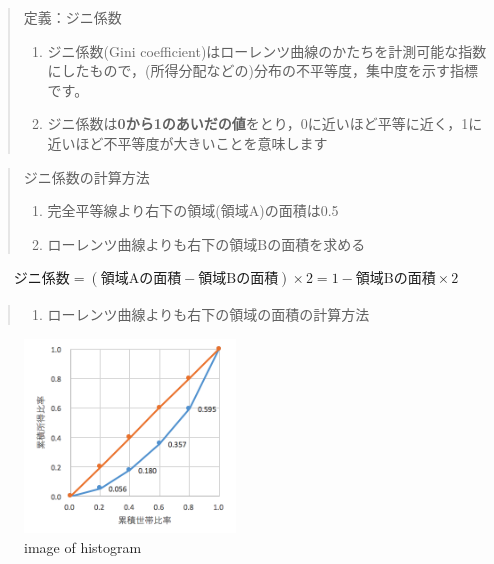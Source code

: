 \documentclass[
]{book}
\providecommand{\tightlist}{%
  \setlength{\itemsep}{0pt}\setlength{\parskip}{0pt}}
\theoremstyle{definition}
\theoremstyle{definition}
\theoremstyle{definition}
\theoremstyle{definition}
\theoremstyle{remark}
\begin{document}
\begin{quote}
定義：ジニ係数

\begin{enumerate}
\def\labelenumi{\arabic{enumi}.}
\tightlist
\item
  ジニ係数(Gini coefficient)はローレンツ曲線のかたちを計測可能な指数にしたもので，(所得分配などの)分布の不平等度，集中度を示す指標です。
\item
  ジニ係数は\textbf{0から1のあいだの値}をとり，0に近いほど平等に近く，1に近いほど不平等度が大きいことを意味します
\end{enumerate}
\end{quote}

\begin{quote}
ジニ係数の計算方法

\begin{enumerate}
\def\labelenumi{\arabic{enumi}.}
\tightlist
\item
  完全平等線より右下の領域(領域A)の面積は0.5
\item
  ローレンツ曲線よりも右下の領域Bの面積を求める
\end{enumerate}
\end{quote}

\begin{align*}
\text{ジニ係数}
=(\text{領域Aの面積}-\text{領域Bの面積})\times 2
=1-\text{領域Bの面積}\times 2 
\end{align*}

\begin{quote}
\begin{enumerate}
\def\labelenumi{\arabic{enumi}.}
\setcounter{enumi}{2}
\tightlist
\item
  ローレンツ曲線よりも右下の領域の面積の計算方法
\end{enumerate}
\end{quote}

\begin{figure}
\centering
\includegraphics[width=0.5\textwidth,height=\textheight]{images/lec03/fig_us_lorenz1966.png}
\caption{image of histogram}
\end{figure}
\end{document}
